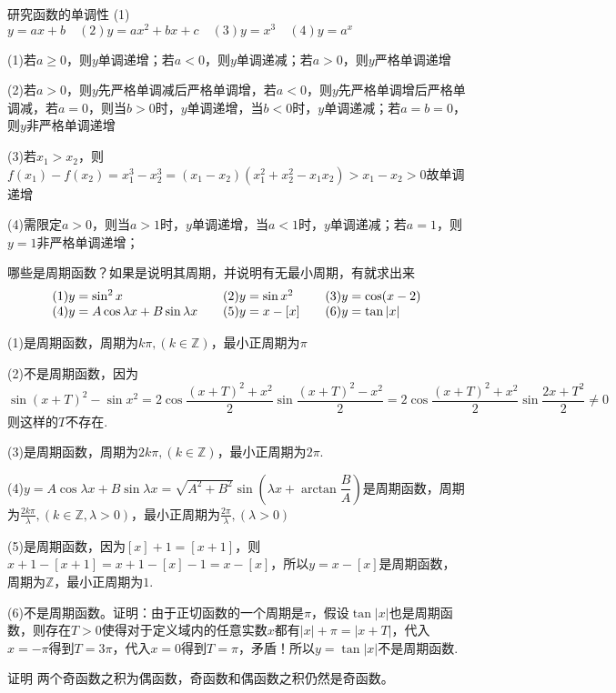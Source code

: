 \begin{example}{研究函数的单调性}{}
    (1)$y=ax+b\quad(2)y=ax^2+bx+c\quad(3)y=x^3\quad(4)y=a^x$
\end{example}
\begin{solution}
    (1)若$a\ge0$，则$y$单调递增；若$a<0$，则$y$单调递减；若$a>0$，则$y$严格单调递增

    (2)若$a>0$，则$y$先严格单调减后严格单调增，若$a<0$，则$y$先严格单调增后严格单调减，若$a=0$，则当$b>0$时，$y$单调递增，当$b<0$时，$y$单调递减；若$a=b=0$，则$y$非严格单调递增

    (3)若$x_1>x_2$，则$f(x_1)-f(x_2)=x_1^3-x_2^3=(x_1-x_2)(x_1^2+x_2^2-x_1x_2)>x_1-x_2>0$故单调递增

    (4)需限定$a>0$，则当$a>1$时，$y$单调递增，当$a<1$时，$y$单调递减；若$a=1$，则$y=1$非严格单调递增；
\end{solution}
\begin{example}{哪些是周期函数？如果是说明其周期，并说明有无最小周期，有就求出来}{}
    \[\begin{array}{l@{\quad\quad}l@{\quad\quad}l}
    (1)y=\sin^2x&(2)y=\sin x^2&(3)y=\cos(x-2)\\
    (4)y=A\cos\lambda x+B\sin\lambda x&(5)y=x-[x]&(6)y=\tan|x|
    \end{array}\]
\end{example}
\begin{solution}
    (1)是周期函数，周期为$k\pi,(k\in\mathbb{Z})$，最小正周期为$\pi$

    (2)不是周期函数，因为\[\sin(x+T)^2-\sin x^2=2\cos\dfrac{(x+T)^2+x^2}{2}\sin\dfrac{(x+T)^2-x^2}{2}=2\cos\dfrac{(x+T)^2+x^2}{2}\sin\dfrac{2x+T^2}{2}\ne 0\]则这样的$T$不存在.

    (3)是周期函数，周期为$2k\pi,(k\in\mathbb{Z})$，最小正周期为$2\pi$.

    (4)$y=A\cos\lambda x+B\sin\lambda x=\sqrt{A^2+B^2}\sin(\lambda x+\arctan\dfrac{B}{A})$是周期函数，周期为$\frac{2k\pi}{\lambda},(k\in\mathbb{Z},\lambda>0)$，最小正周期为$\frac{2\pi}{\lambda},(\lambda>0)$

    (5)是周期函数，因为$[x]+1 = [x+1]$，则$x+1-[x+1]=x+1-[x]-1=x-[x]$，所以$y=x-[x]$是周期函数，周期为$\mathbb{Z}$，最小正周期为$1$.

    (6)不是周期函数。证明：由于正切函数的一个周期是$\pi$，假设$\tan|x|$也是周期函数，则存在$T>0$使得对于定义域内的任意实数$x$都有$|x|+\pi=|x+T|$，代入$x=-\pi$得到$T=3\pi$，代入$x=0$得到$T=\pi$，矛盾！所以$y=\tan|x|$不是周期函数.
\end{solution}
\begin{example}{证明}{}
    两个奇函数之积为偶函数，奇函数和偶函数之积仍然是奇函数。
\end{example}

